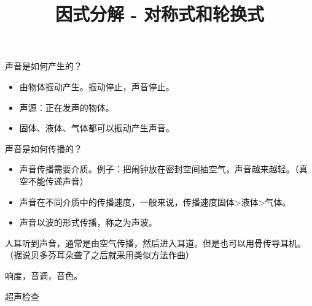 \documentclass[windows,csize4]{BHCexam}
\title{因式分解 - 对称式和轮换式}
\begin{document}
\maketitle

\begin{groups}
    声音是如何产生的？
    \begin{itemize}
        \item 由物体振动产生。振动停止，声音停止。
        \item 声源：正在发声的物体。
        \item 固体、液体、气体都可以振动产生声音。
    \end{itemize}

    声音是如何传播的？
    \begin{itemize}
        \item 声音传播需要介质。例子：把闹钟放在密封空间抽空气，声音越来越轻。（真空不能传递声音）
        \item 声音在不同介质中的传播速度，一般来说，传播速度固体>液体>气体。
        \item 声音以波的形式传播，称之为声波。
    \end{itemize}

    人耳听到声音，通常是由空气传播，然后进入耳道。但是也可以用骨传导耳机。（据说贝多芬耳朵聋了之后就采用类似方法作曲）
    
响度，音调，音色。



    超声检查


\end{groups}

\label{lastpage}
\end{document}

